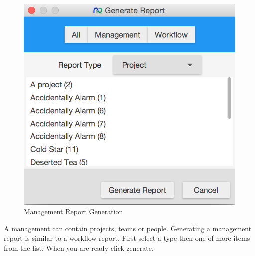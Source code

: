 \begin{figure}[H]
	\centering
	\includegraphics[width=\textwidth]{images/screenshots/report2.PNG}
	\caption{Management Report Generation}
	\label{fig:generate_report_management}
\end{figure}

A management can contain projects, teams or people. Generating a management report is similar to a workflow report. First select a type then one of more items from the list. When you are ready click generate.